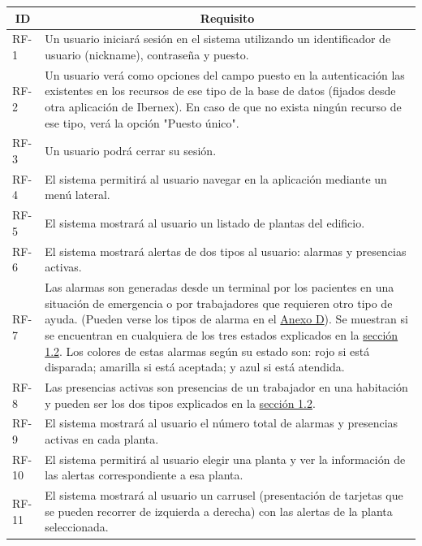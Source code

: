 \begin{longtable}{|p{1cm}|p{14cm}|}
	\hline
	\multicolumn{1}{|c|}{\centering \textbf{ID}} & \multicolumn{1}{c|}{\centering \textbf{Requisito}} \\
	\hline
	RF-1 	& 	Un usuario iniciará sesión en el sistema utilizando un identificador de usuario (nickname), contraseña y puesto. \\
	\hline
	RF-2	&	Un usuario verá como opciones del campo puesto en la autenticación las existentes en los recursos de ese tipo de la base de datos (fijados desde otra aplicación de Ibernex). En caso de que no exista ningún recurso de ese tipo, verá la opción "Puesto único".	\\
	\hline
	RF-3	&	Un usuario podrá cerrar su sesión.	\\
	\hline
	RF-4	&	El sistema permitirá al usuario navegar en la aplicación mediante un menú lateral. \\
	\hline
	RF-5	&	El sistema mostrará al usuario un listado de plantas del edificio. \\
	\hline
	RF-6	&	El sistema mostrará alertas de dos tipos al usuario: alarmas y presencias activas. \\
	\hline
	RF-7	&	Las alarmas son generadas desde un terminal por los pacientes en una situación de emergencia o por trabajadores que requieren otro tipo de ayuda. (Pueden verse los tipos de alarma en el \hyperref[anexo-d]{Anexo D}). Se muestran si se encuentran en cualquiera de los tres estados explicados en la \hyperref[section-objetivos]{sección 1.2}. Los colores de estas alarmas según su estado son: rojo si está disparada; amarilla si está aceptada; y azul si está atendida. \\
	\hline
	RF-8	&	Las presencias activas son presencias de un trabajador en una habitación y pueden ser los dos tipos explicados en la \hyperref[section-objetivos]{sección 1.2}. \\
	\hline
	RF-9	&	El sistema mostrará al usuario el número total de alarmas y presencias activas en cada planta. \\
	\hline
	RF-10	&	El sistema permitirá al usuario elegir una planta y ver la información de las alertas correspondiente a esa planta. \\
	\hline
	RF-11	&	El sistema mostrará al usuario un carrusel (presentación de tarjetas que se pueden recorrer de izquierda a derecha) con las alertas de la planta seleccionada. \\

\end{longtable}
